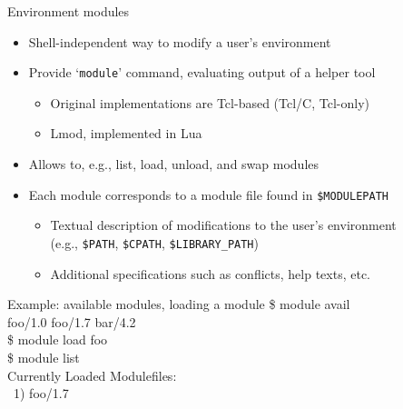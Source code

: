 \documentclass[10pt,xcolor={usenames,dvipsnames}]{beamer}
\begin{document}
\begin{frame}{Environment modules}
\begin{itemize}
    \item
        Shell-independent way to modify a user's environment
    \item
        Provide `\texttt{module}' command, evaluating output of a helper tool
        \begin{itemize}
            \item
                Original implementations are Tcl-based (Tcl/C, Tcl-only)
            \item
                Lmod, implemented in Lua
        \end{itemize}
    \item
        Allows to, e.g., list, load, unload, and swap modules
    \item
        Each module corresponds to a module file found in \texttt{\$MODULEPATH}
        \begin{itemize}
            \item
                Textual description of modifications to the user's environment\\
                (e.g., \texttt{\$PATH}, \texttt{\$CPATH},
                \texttt{\$LIBRARY\_PATH})
            \item
                Additional specifications such as conflicts, help texts, etc.
        \end{itemize}
\end{itemize}
\vspace*{-10pt}
\begin{center}
    \begin{minipage}{0.9\textwidth}
        \begin{exampleblock}{Example: available modules, loading a module}
            \ttfamily
            \$ module avail\\
            foo/1.0 \quad foo/1.7 \quad bar/4.2\\
            \$ module load foo\\
            \$ module list\\
            Currently Loaded Modulefiles:\\
            ~1) foo/1.7
        \end{exampleblock}
    \end{minipage}
\end{center}
\end{frame}

\end{document}
